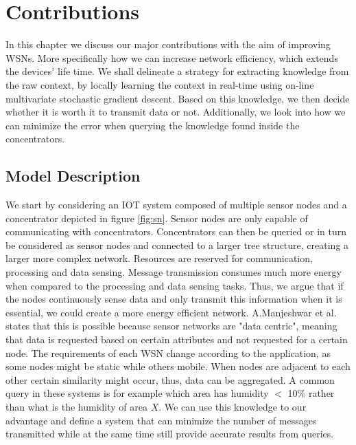 \documentclass{mproj}
\begin{document}

\chapter{Contributions}
In this chapter we discuss our major contributions with the aim of improving WSNs. More specifically how we can increase network efficiency, which extends the devices' life time. We shall delineate a strategy for extracting knowledge from the raw context, by locally learning the context in real-time using on-line multivariate stochastic gradient descent. Based on this knowledge, we then decide whether it is worth it to transmit data or not.
Additionally, we look into how we can minimize the error when querying the knowledge found inside the concentrators.

\section{Model Description}
We start by considering an IOT system composed of multiple sensor nodes and a concentrator depicted in figure \ref{fig:sn}. Sensor nodes are only capable of communicating with concentrators. Concentrators can then be queried or in turn be considered as sensor nodes and connected to a larger tree structure, creating a larger more complex network. Resources are reserved for communication, processing and data sensing. Message transmission consumes much more energy when compared to the processing and data sensing tasks. \cite{teen} Thus, we argue that if the nodes continuously sense data and only transmit this information when it is essential, we could create a more energy efficient network. A.Manjeshwar et al. \cite{teen} states that this is possible because sensor networks are "data centric", meaning that data is requested based on certain attributes and not requested for a certain node. The requirements of each WSN change according to the application, as some nodes might be static while others mobile. When nodes are adjacent to each other certain similarity might occur, thus, data can be aggregated. A common query in these systems is for example which area has humidity $<$ 10\% rather than what is the humidity of area $X$. We can use this knowledge to our advantage and define a system that can minimize the number of messages transmitted while at the same time still provide accurate results from queries.
\end{document}
